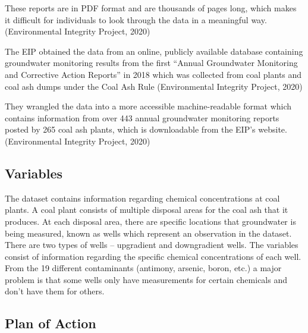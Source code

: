 \documentclass[12pt, twoside]{amherstthesis}
\begin{document}
These reports are in PDF format and are thousands of pages long, which makes it difficult for individuals to look through the data in a meaningful way. (Environmental Integrity Project, 2020)

The EIP obtained the data from an online, publicly available database containing groundwater monitoring results from the first ``Annual Groundwater Monitoring and Corrective Action Reports'' in 2018 which was collected from coal plants and coal ash dumps under the Coal Ash Rule (Environmental Integrity Project, 2020)

They wrangled the data into a more accessible machine-readable format which contains information from over 443 annual groundwater monitoring reports posted by 265 coal ash plants, which is downloadable from the EIP's website. (Environmental Integrity Project, 2020)

\newpage

\hypertarget{variables}{%
\subsection{Variables}\label{variables}}

The dataset contains information regarding chemical concentrations at coal plants. A coal plant consists of multiple disposal areas for the coal ash that it produces. At each disposal area, there are specific locations that groundwater is being measured, known as wells which represent an observation in the dataset. There are two types of wells -- upgradient and downgradient wells. The variables consist of information regarding the specific chemical concentrations of each well. From the 19 different contaminants (antimony, arsenic, boron, etc.) a major problem is that some wells only have measurements for certain chemicals and don't have them for others.

\hypertarget{plan-of-action}{%
\subsection{Plan of Action}\label{plan-of-action}}
\end{document}
